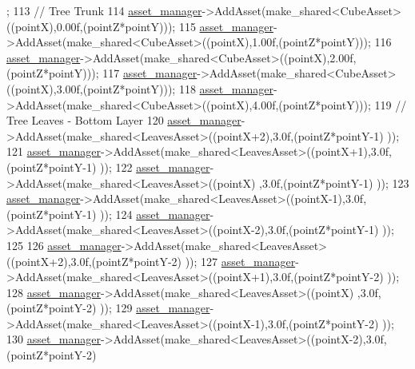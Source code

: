 \begin{DoxyCode}
      ;
113             \textcolor{comment}{// Tree Trunk}
114             \hyperlink{classGameWorld_aec5c0bca4fb5a41e4aac2dce2871266d}{asset\_manager}->AddAsset(make\_shared<CubeAsset>((pointX),0.00f,(pointZ*pointY)));
115             \hyperlink{classGameWorld_aec5c0bca4fb5a41e4aac2dce2871266d}{asset\_manager}->AddAsset(make\_shared<CubeAsset>((pointX),1.00f,(pointZ*pointY)));
116             \hyperlink{classGameWorld_aec5c0bca4fb5a41e4aac2dce2871266d}{asset\_manager}->AddAsset(make\_shared<CubeAsset>((pointX),2.00f,(pointZ*pointY)));
117             \hyperlink{classGameWorld_aec5c0bca4fb5a41e4aac2dce2871266d}{asset\_manager}->AddAsset(make\_shared<CubeAsset>((pointX),3.00f,(pointZ*pointY)));
118             \hyperlink{classGameWorld_aec5c0bca4fb5a41e4aac2dce2871266d}{asset\_manager}->AddAsset(make\_shared<CubeAsset>((pointX),4.00f,(pointZ*pointY)));
119             \textcolor{comment}{// Tree Leaves - Bottom Layer}
120             \hyperlink{classGameWorld_aec5c0bca4fb5a41e4aac2dce2871266d}{asset\_manager}->AddAsset(make\_shared<LeavesAsset>((pointX+2),3.0f,(pointZ*pointY-1)
      ));
121             \hyperlink{classGameWorld_aec5c0bca4fb5a41e4aac2dce2871266d}{asset\_manager}->AddAsset(make\_shared<LeavesAsset>((pointX+1),3.0f,(pointZ*pointY-1)
      ));
122             \hyperlink{classGameWorld_aec5c0bca4fb5a41e4aac2dce2871266d}{asset\_manager}->AddAsset(make\_shared<LeavesAsset>((pointX)  ,3.0f,(pointZ*pointY-1)
      ));
123             \hyperlink{classGameWorld_aec5c0bca4fb5a41e4aac2dce2871266d}{asset\_manager}->AddAsset(make\_shared<LeavesAsset>((pointX-1),3.0f,(pointZ*pointY-1)
      ));
124             \hyperlink{classGameWorld_aec5c0bca4fb5a41e4aac2dce2871266d}{asset\_manager}->AddAsset(make\_shared<LeavesAsset>((pointX-2),3.0f,(pointZ*pointY-1)
      ));
125 
126             \hyperlink{classGameWorld_aec5c0bca4fb5a41e4aac2dce2871266d}{asset\_manager}->AddAsset(make\_shared<LeavesAsset>((pointX+2),3.0f,(pointZ*pointY-2)
      ));
127             \hyperlink{classGameWorld_aec5c0bca4fb5a41e4aac2dce2871266d}{asset\_manager}->AddAsset(make\_shared<LeavesAsset>((pointX+1),3.0f,(pointZ*pointY-2)
      ));
128             \hyperlink{classGameWorld_aec5c0bca4fb5a41e4aac2dce2871266d}{asset\_manager}->AddAsset(make\_shared<LeavesAsset>((pointX)  ,3.0f,(pointZ*pointY-2)
      ));
129             \hyperlink{classGameWorld_aec5c0bca4fb5a41e4aac2dce2871266d}{asset\_manager}->AddAsset(make\_shared<LeavesAsset>((pointX-1),3.0f,(pointZ*pointY-2)
      ));
130             \hyperlink{classGameWorld_aec5c0bca4fb5a41e4aac2dce2871266d}{asset\_manager}->AddAsset(make\_shared<LeavesAsset>((pointX-2),3.0f,(pointZ*pointY-2)

\end{DoxyCode}
